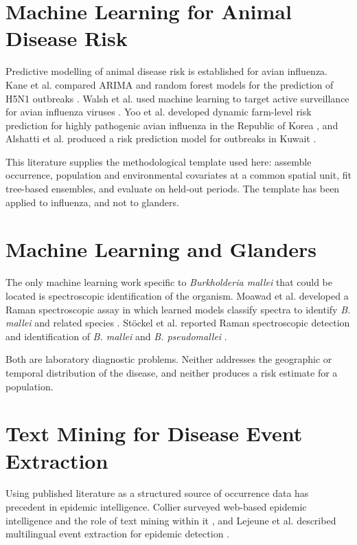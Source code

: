 \documentclass[10pt,openany]{report}
\begin{document}
\section{Machine Learning for Animal Disease Risk}

Predictive modelling of animal disease risk is established for avian influenza. Kane et al.
compared ARIMA and random forest models for the prediction of H5N1 outbreaks \cite{kane2014}.
Walsh et al. used machine learning to target active surveillance for avian influenza viruses
\cite{walsh2019}. Yoo et al. developed dynamic farm-level risk prediction for highly pathogenic
avian influenza in the Republic of Korea \cite{yoo2022}, and Alshatti et al. produced a risk
prediction model for outbreaks in Kuwait \cite{alshatti2026}.

This literature supplies the methodological template used here: assemble occurrence, population
and environmental covariates at a common spatial unit, fit tree-based ensembles, and evaluate on
held-out periods. The template has been applied to influenza, and not to glanders.

\section{Machine Learning and Glanders}

The only machine learning work specific to \textit{Burkholderia mallei} that could be located is
spectroscopic identification of the organism. Moawad et al. developed a Raman spectroscopic assay
in which learned models classify spectra to identify \textit{B. mallei} and related species
\cite{moawad2019}. St\"ockel et al. reported Raman spectroscopic detection and identification of
\textit{B. mallei} and \textit{B. pseudomallei} \cite{stoeckel2015}.

Both are laboratory diagnostic problems. Neither addresses the geographic or temporal
distribution of the disease, and neither produces a risk estimate for a population.

\section{Text Mining for Disease Event Extraction}

Using published literature as a structured source of occurrence data has precedent in epidemic
intelligence. Collier surveyed web-based epidemic intelligence and the role of text mining within
it \cite{collier2012}, and Lejeune et al. described multilingual event extraction for epidemic
detection \cite{lejeune2015}.
\end{document}

